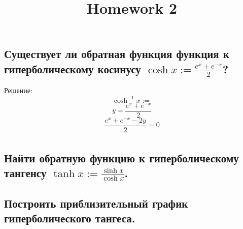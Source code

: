 \documentclass[a4paper, fontsize=10pt]{article}
\title{Homework 2}
\date{}
\begin{document}
\maketitle

\section{}
\subsection{\normalsize \normalfont Существует ли обратная функция функция к гиперболическому косинусу $\cosh{x} := \frac{e^x + e^{-x}}{2}$?}

\indent Решение:
$$\cosh^{-1}{x} :=$$
$$y = \frac{e^x + e^{-x}}{2}$$
$$ \frac{e^x + e^{-x} - 2y}{2} = 0$$
\begin{align*}
\end{align*}


\subsection{\normalsize \normalfont Найти обратную функцию к гиперболическому тангенсу $\tanh{x} := \frac{\sinh{x}}{\cosh{x}}$.}
\subsection{\normalsize \normalfont Построить приблизительный график гиперболического тангеса.}
\end{document}
